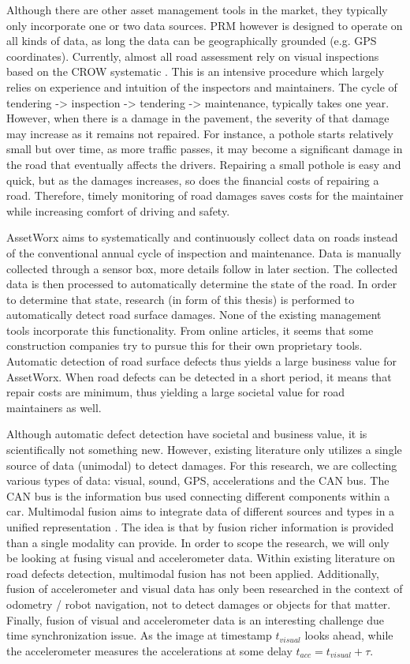 Although there are other asset management tools in the market, they typically only incorporate one or two data sources. PRM however is designed to operate on all kinds of data, as long the data can be geographically grounded (e.g. GPS coordinates). Currently, almost all road assessment rely on visual inspections based on the CROW systematic \cite{CROW_147}. This is an intensive procedure which largely relies on experience and intuition of the inspectors and maintainers. The cycle of tendering -> inspection -> tendering -> maintenance, typically takes one year. However, when there is a damage in the pavement, the severity of that damage may increase as it remains not repaired. For instance, a pothole starts relatively small but over time, as more traffic passes, it may become a significant damage in the road that eventually affects the drivers. Repairing a small pothole is easy and quick, but as the damages increases, so does the financial costs of repairing a road. Therefore, timely monitoring of road damages saves costs for the maintainer while increasing comfort of driving and safety.

AssetWorx aims to systematically and continuously collect data on roads instead of the conventional annual cycle of inspection and maintenance. Data is manually collected through a sensor box, more details follow in later section. The collected data is then processed to automatically determine the state of the road. In order to determine that state, research (in form of this thesis) is performed to automatically detect road surface damages. None of the existing management tools incorporate this functionality. From online articles, it seems that some construction companies try to pursue this for their own proprietary tools. Automatic detection of road surface defects thus yields a large business value for AssetWorx. When road defects can be detected in a short period, it means that repair costs are minimum, thus yielding a large societal value for road maintainers as well.

Although automatic defect detection have societal and business value, it is scientifically not something new. However, existing literature only utilizes a single source of data (unimodal) to detect damages. For this research, we are collecting various types of data: visual, sound, GPS, accelerations and the CAN bus. The CAN bus is the information bus used connecting different components within a car. Multimodal fusion aims to integrate data of different sources and types in a unified representation \cite{Baltrusaitis2017}. The idea is that by fusion richer information is provided than a single modality can provide. In order to scope the research, we will only be looking at fusing visual and accelerometer data. Within existing literature on road defects detection, multimodal fusion has not been applied. Additionally, fusion of accelerometer and visual data has only been researched in the context of odometry / robot navigation, not to detect damages or objects for that matter. Finally, fusion of visual and accelerometer data is an interesting challenge due time synchronization issue. As the image at timestamp $t_{visual}$ looks ahead, while the accelerometer measures the accelerations at some delay $t_{acc} = t_{visual} + \tau$. 


